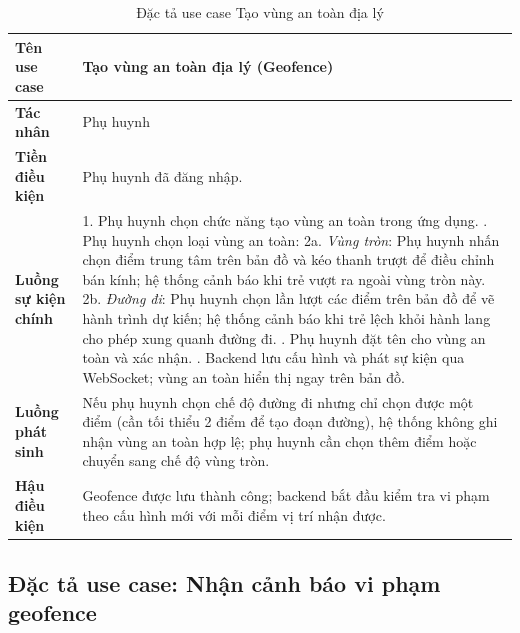 \documentclass[../DoAn.tex]{subfiles}
\begin{document}
\begin{table}[H]
\centering
\caption{Đặc tả use case Tạo vùng an toàn địa lý}
\label{table:uc_geofence}
\begin{tabular}{|l|p{9.5cm}|}
\hline
\textbf{Tên use case}       & Tạo vùng an toàn địa lý (Geofence) \\
\hline
\textbf{Tác nhân}           & Phụ huynh \\
\hline
\textbf{Tiền điều kiện}     & Phụ huynh đã đăng nhập. \\
\hline
\textbf{Luồng sự kiện chính} &
1. Phụ huynh chọn chức năng tạo vùng an toàn trong ứng dụng. \newline
2. Phụ huynh chọn loại vùng an toàn: \newline
\hspace{1em}2a. \textit{Vùng tròn}: Phụ huynh nhấn chọn điểm trung tâm trên bản đồ và kéo thanh trượt để điều chỉnh bán kính; hệ thống cảnh báo khi trẻ vượt ra ngoài vùng tròn này. \newline
\hspace{1em}2b. \textit{Đường đi}: Phụ huynh chọn lần lượt các điểm trên bản đồ để vẽ hành trình dự kiến; hệ thống cảnh báo khi trẻ lệch khỏi hành lang cho phép xung quanh đường đi. \newline
3. Phụ huynh đặt tên cho vùng an toàn và xác nhận. \newline
4. Backend lưu cấu hình và phát sự kiện qua WebSocket; vùng an toàn hiển thị ngay trên bản đồ. \\
\hline
\textbf{Luồng phát sinh}    & Nếu phụ huynh chọn chế độ đường đi nhưng chỉ chọn được một điểm (cần tối thiểu 2 điểm để tạo đoạn đường), hệ thống không ghi nhận vùng an toàn hợp lệ; phụ huynh cần chọn thêm điểm hoặc chuyển sang chế độ vùng tròn. \\
\hline
\textbf{Hậu điều kiện}      & Geofence được lưu thành công; backend bắt đầu kiểm tra vi phạm theo cấu hình mới với mỗi điểm vị trí nhận được. \\
\hline
\end{tabular}
\end{table}

\subsection{Đặc tả use case: Nhận cảnh báo vi phạm geofence}
\end{document}
